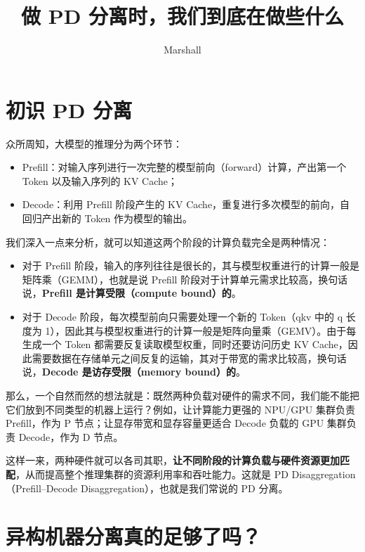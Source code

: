 \documentclass[11pt]{article}
\title{做 PD 分离时，我们到底在做些什么}
\author{Marshall}
\begin{document}
\maketitle

\section{初识 PD 分离}

众所周知，大模型的推理分为两个环节：

\begin{itemize}
  \item Prefill：对输入序列进行一次完整的模型前向（forward）计算，产出第一个 Token 以及输入序列的 KV Cache；
  \item Decode：利用 Prefill 阶段产生的 KV Cache，重复进行多次模型的前向，自回归产出新的 Token 作为模型的输出。
\end{itemize}

我们深入一点来分析，就可以知道这两个阶段的计算负载完全是两种情况：

\begin{itemize}
  \item 对于 Prefill 阶段，输入的序列往往是很长的，其与模型权重进行的计算一般是矩阵乘（GEMM），也就是说 Prefill 阶段对于计算单元需求比较高，换句话说，\textbf{Prefill 是计算受限（compute bound）的}。
  \item 对于 Decode 阶段，每次模型前向只需要处理一个新的 Token（qkv 中的 q 长度为 1），因此其与模型权重进行的计算一般是矩阵向量乘（GEMV）。由于每生成一个 Token 都需要反复读取模型权重，同时还要访问历史 KV Cache，因此需要数据在存储单元之间反复的运输，其对于带宽的需求比较高，换句话说，\textbf{Decode 是访存受限（memory bound）的}。
\end{itemize}

那么，一个自然而然的想法就是：既然两种负载对硬件的需求不同，我们能不能把它们放到不同类型的机器上运行？例如，让计算能力更强的 NPU/GPU 集群负责 Prefill，作为 P 节点；让显存带宽和显存容量更适合 Decode 负载的 GPU 集群负责 Decode，作为 D 节点。

这样一来，两种硬件就可以各司其职，\textbf{让不同阶段的计算负载与硬件资源更加匹配}，从而提高整个推理集群的资源利用率和吞吐能力。这就是 PD Disaggregation（Prefill--Decode Disaggregation），也就是我们常说的 PD 分离。

\section{异构机器分离真的足够了吗？}
\end{document}
